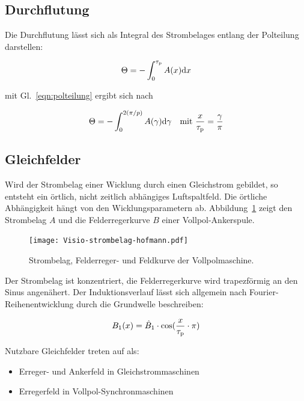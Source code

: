 \subsection{Durchflutung}\label{sec:durchflutung}

Die Durchflutung lässt sich als Integral des Strombelages entlang der Polteilung darstellen:

\begin{align}
\Theta = -\int_0^{\tau_{\mathrm{p}}} A(x)\mathrm{d}x
\end{align}

mit Gl.~\ref{eqn:polteilung} ergibt sich nach \textcite[S.~200]{hofmann2013}

\begin{align}
\Theta = - \int_0^{2(\pi /p)} A(\gamma)\mathrm{d}\gamma \quad \text{mit}\,\, \frac{x}{\tau_{\mathrm{p}}}=\frac{\gamma}{\pi}
\end{align}
\newpage

\subsection{Gleichfelder}\label{sec:gleichfelder}

Wird der Strombelag einer Wicklung durch einen Gleichstrom gebildet, so entsteht ein örtlich, nicht zeitlich abhängiges Luftspaltfeld.
Die örtliche Abhängigkeit hängt von den Wicklungsparametern ab.
Abbildung~\ref{fig:Visio-strombelag-hofmann} zeigt den Strombelag $A$ und die Felderregerkurve $B$ einer Vollpol-Ankerspule.

\begin{figure}[h!]
	\centering
	\texttt{[image: Visio-strombelag-hofmann.pdf]}
	\label{fig:Visio-strombelag-hofmann}
	\caption{Strombelag, Felderreger- und Feldkurve der Vollpolmaschine.}
\end{figure}

Der Strombelag ist konzentriert, die Felderregerkurve wird trapezförmig an den Sinus angenähert.
Der Induktionsverlauf lässt sich allgemein nach Fourier-Reihenentwicklung durch die Grundwelle beschreiben:

\begin{align}
B_{\mathrm{1}}(x) = \hat{B}_{\mathrm{1}}\cdot\cos(\frac{x}{\tau_{\mathrm{p}}}\cdot \pi)
\end{align}


Nutzbare Gleichfelder treten auf als:
\begin{itemize}
	\item Erreger- und Ankerfeld in Gleichstrommaschinen
	\item Erregerfeld in Vollpol-Synchronmaschinen
\end{itemize}

